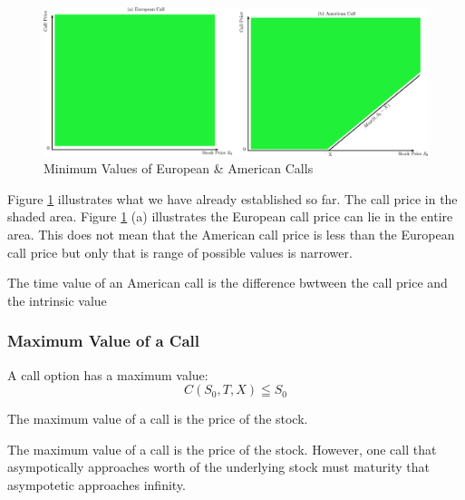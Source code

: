\documentclass{book}
\theoremstyle{definition}
\theoremstyle{remark}
\begin{document}
                \begin{figure}[H]
                    \centering
                        \includegraphics[scale=0.45]{images/fig:CallMin.eps}
                    \caption{Minimum Values of European \& American Calls}
                    \label{fig:2CallMin}                
                \end{figure}
            
            Figure \ref{fig:2CallMin} illustrates what we have already established so far. The call price in the shaded area. Figure \ref{fig:2CallMin} (a) illustrates the European call price can lie in the entire area. This does not mean that the American call price is less than the European call price but only that is range of possible values is narrower.
            
        \begin{tcolorbox}[colback=blue!5!white,colframe=blue!75!black, title=Sticky Note]
            The time value of an American call is the difference bwtween the call price and the intrinsic value
        \end{tcolorbox}              
            
        \subsubsection{Maximum Value of a Call}
            A call option has a maximum value: 
                \begin{equation}
                    C(S_0, T, X) \leqq S_0
                \end{equation}
        
        \begin{tcolorbox}[colback=blue!5!white,colframe=blue!75!black, title=Sticky Note]
            The maximum value of a call is the price of the stock. 
        \end{tcolorbox}  
            
            The maximum value of a call is the price of the stock. However, one call that asympotically approaches worth of the underlying stock must maturity that asympotetic approaches infinity.
            
\end{document}
